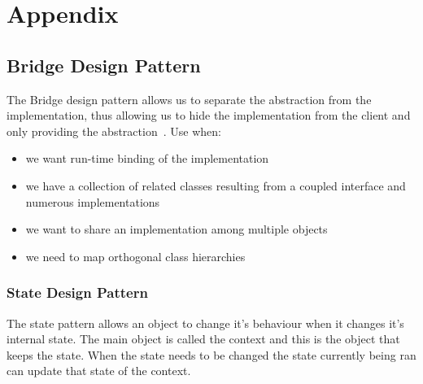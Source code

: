 \chapter{Appendix}

\section{Bridge Design Pattern}
The Bridge design pattern allows us to separate the abstraction from the implementation, thus
allowing us to hide the implementation from the client and only providing the abstraction~\citep{OODesign}.
Use when:
\begin{itemize}
	\item we want run-time binding of the implementation
	\item we have a collection of related classes resulting from a coupled interface and numerous
	implementations
	\item we want to share an implementation among multiple objects
	\item we need to map orthogonal class hierarchies
\end{itemize}

\subsection{State Design Pattern}
The state pattern allows an object to change it's behaviour when it changes it's internal state. The main object is called the context and this is the object that keeps the state. When the state needs to be changed the state currently being ran can update that state of the context.
